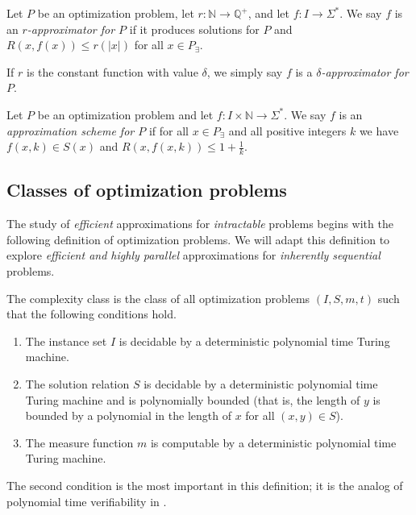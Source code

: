 \documentclass[]{article}
\begin{document}
\begin{definition}
  Let $P$ be an optimization problem, let $r \colon \mathbb{N} \to \mathbb{Q}^+$, and let $f \colon I \to \Sigma^*$.
  We say $f$ is an \emph{$r$-approximator for $P$} if it produces solutions for $P$ and $R(x, f(x)) \leq r(|x|)$ for all $x \in P_\exists$.

  If $r$ is the constant function with value $\delta$, we simply say $f$ is a \emph{$\delta$-approximator for $P$}.
\end{definition}

\begin{definition}
  Let $P$ be an optimization problem and let $f \colon I \times \mathbb{N} \to \Sigma^*$.
  We say $f$ is an \emph{approximation scheme for $P$} if for all $x \in P_\exists$ and all positive integers $k$ we have $f(x, k)\in S(x)$ and $R(x, f(x, k)) \leq 1 + \frac{1}{k}$.
\end{definition}

\subsection{Classes of optimization problems}

The study of \emph{efficient} approximations for \emph{intractable} problems begins with the following definition of \NP{} optimization problems.
We will adapt this definition to explore \emph{efficient and highly parallel} approximations for \emph{inherently sequential} problems.

\begin{definition}\label{def:npo}
  The complexity class \NPO{} is the class of all optimization problems $(I, S, m, t)$ such that the following conditions hold.
  \begin{enumerate}
  \item The instance set $I$ is decidable by a deterministic polynomial time Turing machine.
  \item The solution relation $S$ is decidable by a deterministic polynomial time Turing machine and is polynomially bounded (that is, the length of $y$ is bounded by a polynomial in the length of $x$ for all $(x, y)\in S$).
  \item The measure function $m$ is computable by a deterministic polynomial time Turing machine.
  \end{enumerate}
\end{definition}

The second condition is the most important in this definition; it is the analog of polynomial time verifiability in \NP.
\end{document}
